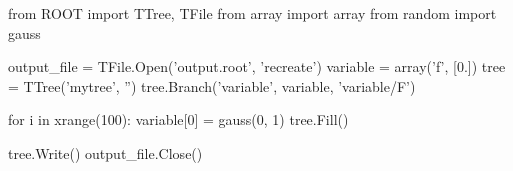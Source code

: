 \begin{footnotesize}
\begin{pyglist}[language=python,texcl=true,style=vs,bgcolor=Moccasin]
from ROOT import TTree, TFile
from array import array
from random import gauss

output_file = TFile.Open('output.root', 'recreate')
variable = array('f', [0.])
tree = TTree('mytree', '')
tree.Branch('variable', variable, 'variable/F')

for i in xrange(100):
    variable[0] = gauss(0, 1)
    tree.Fill()

tree.Write()
output_file.Close()
\end{pyglist}
\end{footnotesize}
